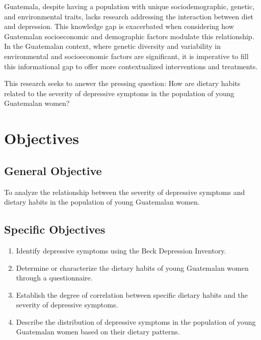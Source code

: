 \documentclass[jou]{apa7}
\begin{document}
Guatemala, despite having a population with unique sociodemographic, genetic, and environmental traits, lacks research addressing the interaction between diet and depression. This knowledge gap is exacerbated when considering how Guatemalan socioeconomic and demographic factors modulate this relationship. In the Guatemalan context, where genetic diversity and variability in environmental and socioeconomic factors are significant, it is imperative to fill this informational gap to offer more contextualized interventions and treatments.

This research seeks to answer the pressing question: How are dietary habits related to the severity of depressive symptoms in the population of young Guatemalan women?


\section{Objectives}\label{objetivos}

\subsection{General Objective}\label{objetivo-general}

To analyze the relationship between the severity of depressive symptoms and dietary habits in the population of young Guatemalan women.

\subsection{Specific Objectives}\label{objetivos-especuxedficos}

\begin{enumerate}
	\item Identify depressive symptoms using the Beck Depression Inventory.
	\item Determine or characterize the dietary habits of young Guatemalan women through a questionnaire.
	\item Establish the degree of correlation between specific dietary habits and the severity of depressive symptoms.
	\item Describe the distribution of depressive symptoms in the population of young Guatemalan women based on their dietary patterns.
\end{enumerate}
\end{document}
